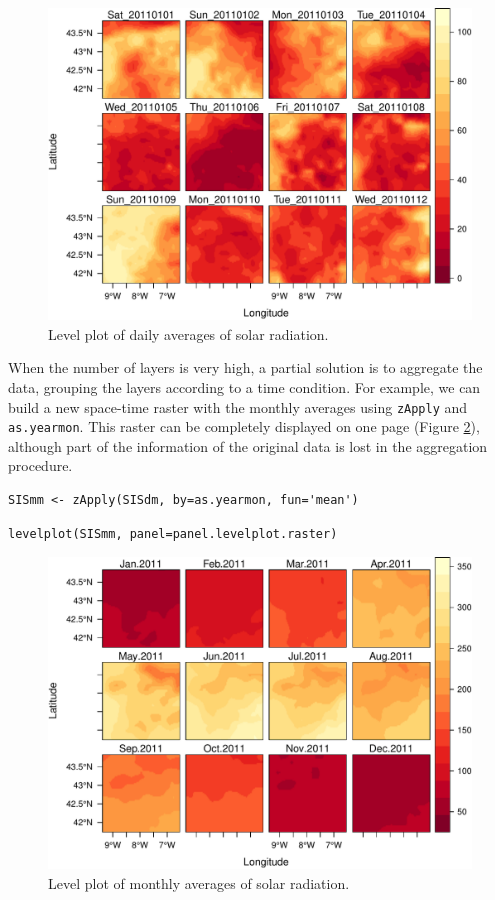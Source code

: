 \begin{figure}[htb]
\centering
\includegraphics[width=.9\linewidth]{figs/SISdm.pdf}
\caption{\label{fig:SISdm}Level plot of daily averages of solar radiation.}
\end{figure}

When the number of layers is very high, a partial solution is to
aggregate the data, grouping the layers according to a time
condition. For example, we can build a new space-time raster with
the monthly averages using \texttt{zApply} and \texttt{as.yearmon}. This raster
can be completely displayed on one page (Figure \ref{fig:SISmm}),
although part of the information of the original data is lost in
the aggregation procedure.


\lstset{language=R,numbers=none}
\begin{lstlisting}
SISmm <- zApply(SISdm, by=as.yearmon, fun='mean')
\end{lstlisting}

\lstset{language=R,numbers=none}
\begin{lstlisting}
levelplot(SISmm, panel=panel.levelplot.raster)
\end{lstlisting}

\begin{figure}[htb]
\centering
\includegraphics[width=.9\linewidth]{figs/SISmm.pdf}
\caption{\label{fig:SISmm}Level plot of monthly averages of solar radiation.}
\end{figure}

